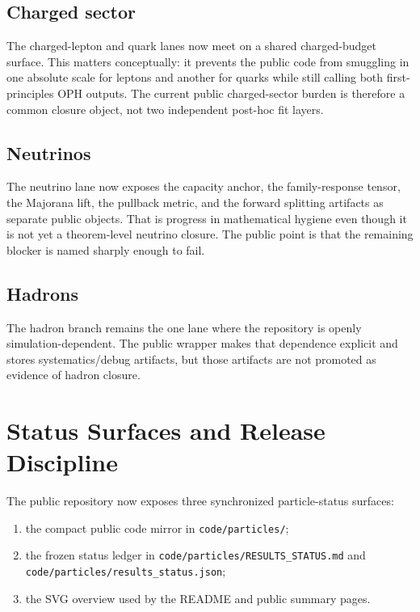 \documentclass[11pt]{article}
\begin{document}
\subsection{Charged sector}

The charged-lepton and quark lanes now meet on a shared charged-budget surface.
This matters conceptually: it prevents the public code from smuggling in one
absolute scale for leptons and another for quarks while still calling both
first-principles OPH outputs. The current public charged-sector burden is
therefore a common closure object, not two independent post-hoc fit layers.

\subsection{Neutrinos}

The neutrino lane now exposes the capacity anchor, the family-response tensor,
the Majorana lift, the pullback metric, and the forward splitting artifacts as
separate public objects. That is progress in mathematical hygiene even though it
is not yet a theorem-level neutrino closure. The public point is that the
remaining blocker is named sharply enough to fail.

\subsection{Hadrons}

The hadron branch remains the one lane where the repository is openly
simulation-dependent. The public wrapper makes that dependence explicit and
stores systematics/debug artifacts, but those artifacts are not promoted as
evidence of hadron closure.

\section{Status Surfaces and Release Discipline}

The public repository now exposes three synchronized particle-status surfaces:
\begin{enumerate}[leftmargin=2em]
\item the compact public code mirror in \texttt{code/particles/};
\item the frozen status ledger in
\texttt{code/particles/RESULTS\_STATUS.md} and
\texttt{code/particles/results\_status.json};
\item the SVG overview used by the README and public summary pages.
\end{enumerate}
\end{document}
